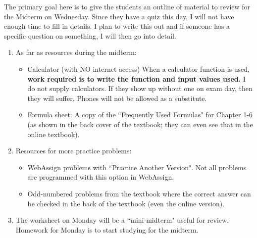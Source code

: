 \documentclass{article}
\begin{document}
The primary goal here is to give the students an outline of material to review for the Midterm on Wednesday. Since they have a quiz this day, I will not have enough time to fill in details. I plan to write this out and if someone has a specific question on something, I will then go into detail.

\begin{enumerate}

  
    \item As far as resources during the midterm:
        
        \begin{itemize}
        
            \item Calculator (with NO internet access) When a calculator function is used, \textbf{work required is to write the function and input values used.} I do not supply calculators. If they show up without one on exam day, then they will suffer. Phones will not be allowed as a substitute.
            
            \item Formula sheet: A copy of the ``Frequently Used Formulas" for Chapter 1-6 (as shown in the back cover of the textbook; they can even see that in the online textbook).
            
        \end{itemize}
        
    \item Resources for more practice problems:
        
        \begin{itemize}
        
            \item WebAssign problems with ``Practice Another Version".  Not all problems are programmed with this option in WebAssign.
            
            \item Odd-numbered problems from the textbook where the correct answer can be checked in the back of the textbook (even the online version).
            
        \end{itemize}
    
    \item The worksheet on Monday will be a ``mini-midterm" useful for review. Homework for Monday is to start studying for the midterm.
    
\end{enumerate}
\end{document}
